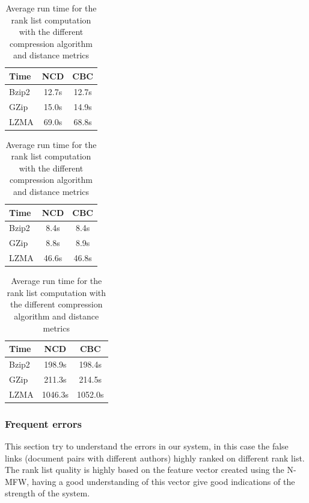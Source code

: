 \begin{table}
  \centering
  \label{tab:compression_evaluation_time}
  \caption{Average run time for the rank list computation with the different compression algorithm and distance metrics}

  \label{tab:compression_evaluation_time_oxquarry}
  \begin{tabular}{l c c}
    \toprule
    Time      & NCD   & CBC \\
    \midrule
    Bzip2     & 12.7s & 12.7s \\
    GZip      & 15.0s & 14.9s \\
    LZMA      & 69.0s & 68.8s \\
    \bottomrule
  \end{tabular}

  \label{tab:compression_evaluation_time_brunet}
  \begin{tabular}{l c c}
    \toprule
    Time      & NCD   & CBC \\
    \midrule
    Bzip2     & 8.4s & 8.4s \\
    GZip      & 8.8s & 8.9s \\
    LZMA      & 46.6s & 46.8s \\
    \bottomrule
  \end{tabular}

  \label{tab:compression_evaluation_time_st_jean}
  \begin{tabular}{l c c}
    \toprule
    Time      & NCD    & CBC \\
    \midrule
    Bzip2     & 198.9s  & 198.4s \\
    GZip      & 211.3s  & 214.5s \\
    LZMA      & 1046.3s & 1052.0s \\
    \bottomrule
  \end{tabular}
\end{table}


\subsubsection{Frequent errors}
\label{sec:frequent_errors}

This section try to understand the errors in our system, in this case the false links (document pairs with different authors) highly ranked on different rank list.
The rank list quality is highly based on the feature vector created using the N-MFW, having a good understanding of this vector give good indications of the strength of the system.

